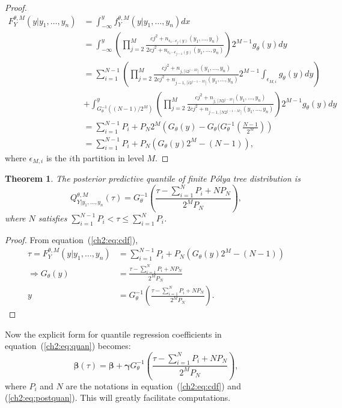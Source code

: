 \documentclass[12pt]{article}
\newtheorem{thm}{Theorem}[section]
\newcommand{\polya}{P\'{o}lya}
\begin{document}
\begin{proof}
  \begin{align*}
    F^{\theta,M}_Y(y| y_1, \ldots, y_n) & = \int_{-\infty}^y
    f_Y^{\theta,M} (y|y_1, \ldots, y_n) dx \\
    & = \int_{-\infty}^y \left( \prod_{j=2}^M \frac{cj^2 +
        n_{\epsilon_1 \cdots \epsilon_j(y) }(y_1, \ldots, y_n)}{2cj^2
        + n_{\epsilon_1 \cdots \epsilon_{j-1}(y)}(y_1, \ldots, y_n)}
    \right)2^{M-1} g_\theta(y) dy \\
    & = \sum_{i=1}^{N-1} \left( \prod_{j=2}^M \frac{cj^2 + n_{j,
          \lceil i2^{j-M} \rceil}(y_1, \ldots, y_n)}{2cj^2 + n_{j-1,
          \lceil i2^{j-1-M} \rceil}(y_1, \ldots, y_n)} 2^{M-1}
      \int_{\epsilon_{M,i}} g_{\theta}(y) dy \right) \\
    &+ \int_{G^{-1}_{\theta}((N-1)/2^M)}^y \left( \prod_{j=2}^M
      \frac{cj^2 + n_{j, \lceil N2^{j-M} \rceil}(y_1, \ldots,
        y_n)}{2cj^2 + n_{j-1, \lceil N2^{j-1-M} \rceil}(y_1, \ldots,
        y_n)}\right) 2^{M-1}
    g_{\theta}(y) dy \\
    & = \sum_{i=1}^{N-1} P_i + P_N 2^M \left( G_{\theta}(y) -
      G_{\theta}(G_{\theta}^{-1}\left( \frac{N-1}{2^M} \right)\right)\\
    & = \sum_{i=1}^{N-1}P_i + P_N \left( G_{\theta}(y) 2^M - (N-1)
    \right),
  \end{align*}
  where $\epsilon_{M,i}$ is the $i$th partition in level $M$.
\end{proof}

\begin{thm}
  The posterior predictive quantile of finite \polya{} tree
  distribution is
  \begin{equation}
    \label{ch2:eq:postquan}
    Q^{\theta, M}_{Y|y_1, \ldots, y_n}(\tau) = G^{-1}_{\theta} \left(
      \frac{\tau- \sum_{i=1}^N P_i + N P_N}{2^M P_N} \right),
  \end{equation}
  where $N$ satisfies $ \sum_{i=1}^{N-1} P_i < \tau \le \sum_{i=1}^N
  P_i$.
\end{thm}

\begin{proof}
  From equation~(\ref{ch2:eq:cdf}),
  \begin{align*}
    \tau = F^{\theta,M}_Y(y|y_1, \ldots, y_n) &= \sum_{i=1}^{N-1}
    P_{i} + P_N
    \left( G_{\theta}(y)2^M -(N-1) \right) \\
    \Rightarrow G_{\theta}(y) &= \frac{\tau - \sum_{i=1}^NP_i +
      NP_N}{2^MP_N} \\
    y & = G_{\theta}^{-1} \left(\frac{\tau - \sum_{i=1}^NP_i +
        NP_N}{2^MP_N} \right).
  \end{align*}
\end{proof}
Now the explicit form for quantile regression coefficients in equation~(\ref{ch2:eq:quan}) becomes:
\begin{equation}
  \label{ch2:eq:newquan}
  \bm{\beta}(\tau) = \bm{\beta} + \bm{\gamma}G_{\theta}^{-1}
  \left(\frac{\tau - \sum_{i=1}^NP_i +
      NP_N}{2^MP_N}  \right),
\end{equation}
where $P_i$ and $N$ are the notations in equation~(\ref{ch2:eq:cdf}) and
(\ref{ch2:eq:postquan}). This will greatly facilitate computations.
\end{document}
